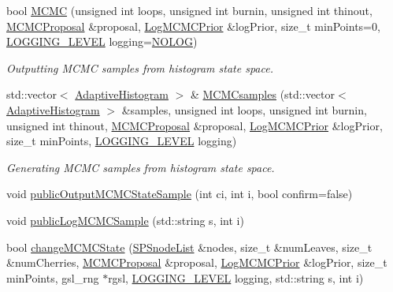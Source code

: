 \begin{DoxyCompactItemize}
bool \hyperlink{classsubpavings_1_1AdaptiveHistogram_a733cc04938b2236087cbbe0384985c3d}{\-M\-C\-M\-C} (unsigned int loops, unsigned int burnin, unsigned int thinout, \hyperlink{classsubpavings_1_1MCMCProposal}{\-M\-C\-M\-C\-Proposal} \&proposal, \hyperlink{classsubpavings_1_1LogMCMCPrior}{\-Log\-M\-C\-M\-C\-Prior} \&log\-Prior, size\-\_\-t min\-Points=0, \hyperlink{namespacesubpavings_aef8e51096b59ecaf1a1e9b2ee24b6089}{\-L\-O\-G\-G\-I\-N\-G\-\_\-\-L\-E\-V\-E\-L} logging=\hyperlink{namespacesubpavings_aef8e51096b59ecaf1a1e9b2ee24b6089a1e5eba048e2496b2450d63fc2e9d1737}{\-N\-O\-L\-O\-G})
\begin{DoxyCompactList}\small\item\em \-Outputting \-M\-C\-M\-C samples from histogram state space. \end{DoxyCompactList}\item 
std\-::vector$<$ \hyperlink{classsubpavings_1_1AdaptiveHistogram}{\-Adaptive\-Histogram} $>$ \& \hyperlink{classsubpavings_1_1AdaptiveHistogram_aac9ce6681faa011b3c314ff400056dd9}{\-M\-C\-M\-Csamples} (std\-::vector$<$ \hyperlink{classsubpavings_1_1AdaptiveHistogram}{\-Adaptive\-Histogram} $>$ \&samples, unsigned int loops, unsigned int burnin, unsigned int thinout, \hyperlink{classsubpavings_1_1MCMCProposal}{\-M\-C\-M\-C\-Proposal} \&proposal, \hyperlink{classsubpavings_1_1LogMCMCPrior}{\-Log\-M\-C\-M\-C\-Prior} \&log\-Prior, size\-\_\-t min\-Points, \hyperlink{namespacesubpavings_aef8e51096b59ecaf1a1e9b2ee24b6089}{\-L\-O\-G\-G\-I\-N\-G\-\_\-\-L\-E\-V\-E\-L} logging)
\begin{DoxyCompactList}\small\item\em \-Generating \-M\-C\-M\-C samples from histogram state space. \end{DoxyCompactList}\item 
void \hyperlink{classsubpavings_1_1AdaptiveHistogram_a0163eb023d0db24e0d91864a38acd562}{public\-Output\-M\-C\-M\-C\-State\-Sample} (int ci, int i, bool confirm=false)
\item 
void \hyperlink{classsubpavings_1_1AdaptiveHistogram_af41faeb2742df1aaa5108f17dee54d71}{public\-Log\-M\-C\-M\-C\-Sample} (std\-::string s, int i)
\item 
bool \hyperlink{classsubpavings_1_1AdaptiveHistogram_a2e95f7f1a9dab963a28a7d3a655e0e8f}{change\-M\-C\-M\-C\-State} (\hyperlink{namespacesubpavings_ae7645253328c3b5fc137829039d971e3}{\-S\-P\-Snode\-List} \&nodes, size\-\_\-t \&num\-Leaves, size\-\_\-t \&num\-Cherries, \hyperlink{classsubpavings_1_1MCMCProposal}{\-M\-C\-M\-C\-Proposal} \&proposal, \hyperlink{classsubpavings_1_1LogMCMCPrior}{\-Log\-M\-C\-M\-C\-Prior} \&log\-Prior, size\-\_\-t min\-Points, gsl\-\_\-rng $\ast$rgsl, \hyperlink{namespacesubpavings_aef8e51096b59ecaf1a1e9b2ee24b6089}{\-L\-O\-G\-G\-I\-N\-G\-\_\-\-L\-E\-V\-E\-L} logging, std\-::string s, int i)

\end{DoxyCompactItemize}
